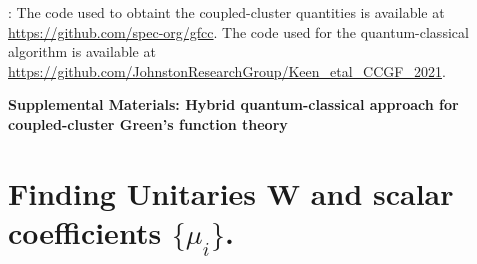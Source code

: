 \documentclass[aip,reprint,table,xcdraw,usenames,dvipsnames]{revtex4-1}
\begin{document}
: The code used to obtaint the coupled-cluster quantities is available at \url{https://github.com/spec-org/gfcc}. The code used for the quantum-classical algorithm is available at \url{https://github.com/JohnstonResearchGroup/Keen_etal_CCGF_2021}. \\

\clearpage

\widetext
\begin{center}
\textbf{\large Supplemental Materials: Hybrid quantum-classical approach for coupled-cluster Green’s function theory}
\end{center}
\setcounter{equation}{0}
\setcounter{figure}{0}
\setcounter{table}{0}
\setcounter{page}{1}
\setcounter{section}{0}
\makeatletter
\renewcommand{\theequation}{S\arabic{equation}}
\renewcommand{\thefigure}{S\arabic{figure}}
\renewcommand{\thesection}{Supplementary Note \arabic{section}}
\renewcommand{\bibnumfmt}[1]{[S#1]}
\renewcommand{\citenumfont}[1]{S#1}


\section{Finding Unitaries $\mathbf{W}$ and scalar coefficients $\{ \mu_i \}$.} \label{sec:ccstuff}
\end{document}
